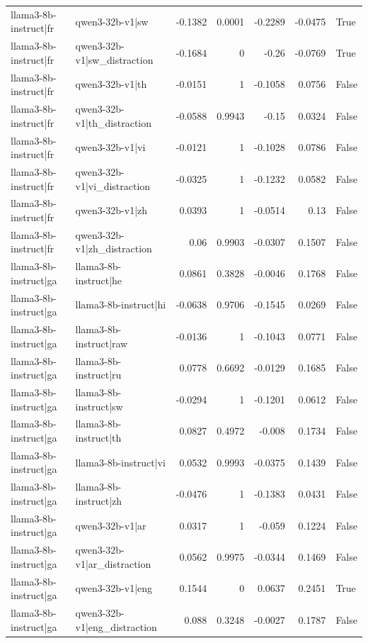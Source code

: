 \begin{table}
\begin{tabular}{l l r r r r l}
llama3-8b-instruct|fr & qwen3-32b-v1|sw & -0.1382 & 0.0001 & -0.2289 & -0.0475 & True \\
llama3-8b-instruct|fr & qwen3-32b-v1|sw_distraction & -0.1684 & 0 & -0.26 & -0.0769 & True \\
llama3-8b-instruct|fr & qwen3-32b-v1|th & -0.0151 & 1 & -0.1058 & 0.0756 & False \\
llama3-8b-instruct|fr & qwen3-32b-v1|th_distraction & -0.0588 & 0.9943 & -0.15 & 0.0324 & False \\
llama3-8b-instruct|fr & qwen3-32b-v1|vi & -0.0121 & 1 & -0.1028 & 0.0786 & False \\
llama3-8b-instruct|fr & qwen3-32b-v1|vi_distraction & -0.0325 & 1 & -0.1232 & 0.0582 & False \\
llama3-8b-instruct|fr & qwen3-32b-v1|zh & 0.0393 & 1 & -0.0514 & 0.13 & False \\
llama3-8b-instruct|fr & qwen3-32b-v1|zh_distraction & 0.06 & 0.9903 & -0.0307 & 0.1507 & False \\
llama3-8b-instruct|ga & llama3-8b-instruct|he & 0.0861 & 0.3828 & -0.0046 & 0.1768 & False \\
llama3-8b-instruct|ga & llama3-8b-instruct|hi & -0.0638 & 0.9706 & -0.1545 & 0.0269 & False \\
llama3-8b-instruct|ga & llama3-8b-instruct|raw & -0.0136 & 1 & -0.1043 & 0.0771 & False \\
llama3-8b-instruct|ga & llama3-8b-instruct|ru & 0.0778 & 0.6692 & -0.0129 & 0.1685 & False \\
llama3-8b-instruct|ga & llama3-8b-instruct|sw & -0.0294 & 1 & -0.1201 & 0.0612 & False \\
llama3-8b-instruct|ga & llama3-8b-instruct|th & 0.0827 & 0.4972 & -0.008 & 0.1734 & False \\
llama3-8b-instruct|ga & llama3-8b-instruct|vi & 0.0532 & 0.9993 & -0.0375 & 0.1439 & False \\
llama3-8b-instruct|ga & llama3-8b-instruct|zh & -0.0476 & 1 & -0.1383 & 0.0431 & False \\
llama3-8b-instruct|ga & qwen3-32b-v1|ar & 0.0317 & 1 & -0.059 & 0.1224 & False \\
llama3-8b-instruct|ga & qwen3-32b-v1|ar_distraction & 0.0562 & 0.9975 & -0.0344 & 0.1469 & False \\
llama3-8b-instruct|ga & qwen3-32b-v1|eng & 0.1544 & 0 & 0.0637 & 0.2451 & True \\
llama3-8b-instruct|ga & qwen3-32b-v1|eng_distraction & 0.088 & 0.3248 & -0.0027 & 0.1787 & False \\

\end{tabular}
\end{table}
